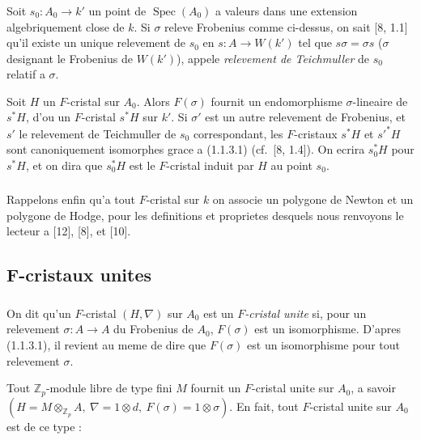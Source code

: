 \documentclass[12pt,a4paper]{article}
\theoremstyle{plain}
\theoremstyle{definition}
\theoremstyle{remark}
\DeclareMathOperator{\Spec}{Spec}
\begin{document}
\subsubsection{}

Soit $s_0 : A_0 \to k'$ un point de $\Spec(A_0)$ a valeurs dans une extension algebriquement close de $k$. Si $\sigma$ releve Frobenius comme ci-dessus, on sait [8, 1.1] qu'il existe un unique relevement de $s_0$ en $s : A \to W(k')$ tel que $s\sigma = \sigma s$ ($\sigma$ designant le Frobenius de $W(k')$), appele \emph{relevement de Teichmuller} de $s_0$ relatif a $\sigma$.

Soit $H$ un $F$-cristal sur $A_0$. Alors $F(\sigma)$ fournit un endomorphisme $\sigma$-lineaire de $s^*H$, d'ou un $F$-cristal $s^*H$ sur $k'$. Si $\sigma'$ est un autre relevement de Frobenius, et $s'$ le relevement de Teichmuller de $s_0$ correspondant, les $F$-cristaux $s^*H$ et $s'^*H$ sont canoniquement isomorphes grace a (1.1.3.1) (cf.\ [8, 1.4]). On ecrira $s_0^*H$ pour $s^*H$, et on dira que $s_0^*H$ est le $F$-cristal induit par $H$ au point $s_0$.

\subsubsection{}

Rappelons enfin qu'a tout $F$-cristal sur $k$ on associe un polygone de Newton et un polygone de Hodge, pour les definitions et proprietes desquels nous renvoyons le lecteur a [12], [8], et [10].

\subsection{F-cristaux unites}

\subsubsection{}

On dit qu'un $F$-cristal $(H,\nabla)$ sur $A_0$ est un \emph{$F$-cristal unite} si, pour un relevement $\sigma : A \to A$ du Frobenius de $A_0$, $F(\sigma)$ est un isomorphisme. D'apres (1.1.3.1), il revient au meme de dire que $F(\sigma)$ est un isomorphisme pour tout relevement $\sigma$.

Tout $\mathbb{Z}_p$-module libre de type fini $M$ fournit un $F$-cristal unite sur $A_0$, a savoir $(H = M \otimes_{\mathbb{Z}_p} A,\ \nabla = 1 \otimes d,\ F(\sigma) = 1 \otimes \sigma)$. En fait, tout $F$-cristal unite sur $A_0$ est de ce type :
\end{document}
